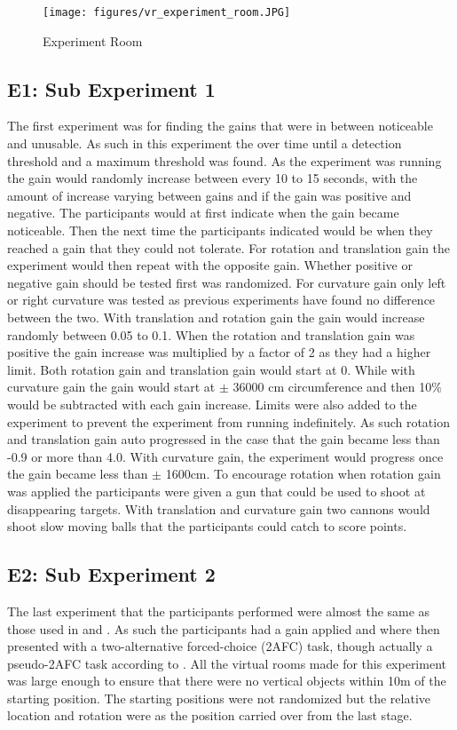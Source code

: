 \begin{figure}
    \centering
    \texttt{[image: figures/vr\_experiment\_room.JPG]}
    \caption{Experiment Room}
    \label{fig:experiment_room}
\end{figure}

\subsection{E1: Sub Experiment 1}
The first experiment was for finding the gains that were in between noticeable and unusable. As such in this experiment the over time until a detection threshold and a maximum threshold was found. As the experiment was running the gain would randomly increase between every 10 to 15 seconds, with the amount of increase varying between gains and if the gain was positive and negative. The participants would at first indicate when the gain became noticeable. Then the next time the participants indicated would be when they reached a gain that they could not tolerate. For rotation and translation gain the experiment would then repeat with the opposite gain. Whether positive or negative gain should be tested first was randomized. For curvature gain only left or right curvature was tested as previous experiments have found no difference between the two. With translation and rotation gain the gain would increase randomly between 0.05 to 0.1. When the rotation and translation gain was positive the gain increase was multiplied by a factor of 2 as they had a higher limit. Both rotation gain and translation gain would start at 0. While with curvature gain the gain would start at $ \pm $ 36000 cm circumference and then 10\% would be subtracted with each gain increase. Limits were also added to the experiment to prevent the experiment from running indefinitely. As such rotation and translation gain auto progressed in the case that the gain became less than -0.9 or more than 4.0. With curvature gain, the experiment would progress once the gain became less than $ \pm $ 1600cm. To encourage rotation when rotation gain was applied the participants were given a gun that could be used to shoot at disappearing targets. With translation and curvature gain two cannons would shoot slow moving balls that the participants could catch to score points.

\subsection{E2: Sub Experiment 2}
The last experiment that the participants performed were almost the same as those used in \cite{steinicke2008analyses} and \cite{steinicke2010estimation}. As such the participants had a gain applied and where then presented with a two-alternative forced-choice (2AFC) task, though actually a pseudo-2AFC task according to \cite{grechkin2016revisiting}. All the virtual rooms made for this experiment was large enough to ensure that there were no vertical objects within 10m of the starting position. The starting positions were not randomized but the relative location and rotation were as the position carried over from the last stage.


